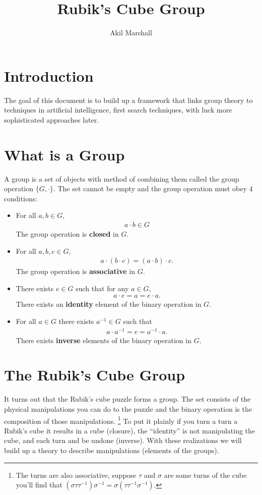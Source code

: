 \documentclass{article}
\title{Rubik's Cube Group}
\author{Akil Marshall}
\begin{document}
\maketitle
\section{Introduction}
The goal of this document is to build up a framework that links group theory to techniques in artificial intelligence, first search techniques, with luck more sophisticated approaches later.

\section{What is a Group}
A group is a set of objects with method of combining them called the group operation $\{ G,\cdot \}$. The set cannot be empty and the group operation must obey 4 conditions:
\begin{itemize}
    \item For all $a,b\in G$,
        \begin{align*}
            a\cdot b\in G
        \end{align*}
        The group operation is \textbf{closed} in $G$.
    \item For all $a,b,c\in G$,
        \begin{align*}
            a\cdot(b\cdot c)=(a\cdot b)\cdot c.
        \end{align*}
        The group operation is \textbf{associative} in $G$.
    \item There exists $e\in G$ such that for any $a\in G$,
        \begin{align*}
            a\cdot e=a=e\cdot a.
        \end{align*}
        There exists an \textbf{identity} element of the binary operation in $G$.
    \item For all $a\in G$ there exists  $a^{-1}\in G$ such that
        \begin{align*}
            a\cdot a^{-1}=e=a^{-1}\cdot a.
        \end{align*}
        There exists \textbf{inverse} elements of the binary operation in $G$.
\end{itemize}
\section{The Rubik's Cube Group}
It turns out that the Rubik's cube puzzle forms a group.
The set consists of the physical manipulations you can do to the puzzle and the binary operation is the composition of those manipulations.
\footnote{The turns are also associative, suppose $\tau$ and $\sigma$ are some turns of the cube you'll find that $(\sigma\tau\tau^{-1})\sigma^{-1}=\sigma(\tau\tau^{-1}\sigma^{-1})$.}
To put it plainly if you turn a turn a Rubik's cube it results in a cube (closure), the ``identity'' is not manipulating the cube, and each turn and be undone (inverse). With these realizations we will build up a theory to describe manipulations (elements of the groups).
\end{document}
